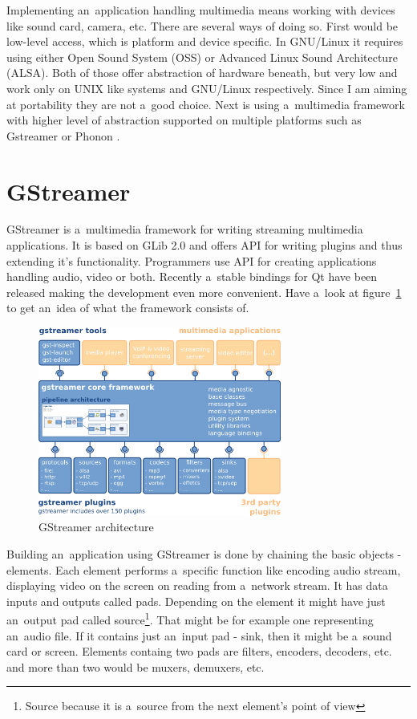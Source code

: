 Implementing an~application handling multimedia means working with devices like sound card, camera, etc. There are several ways of doing so. First would be low-level access, which is platform and device specific. In GNU/Linux it requires using either Open Sound System (OSS) or Advanced Linux Sound Architecture (ALSA). Both of those offer abstraction of hardware beneath, but very low and work only on UNIX like systems and GNU/Linux respectively. Since I am aiming at portability they are not a~good choice. Next is using a~multimedia framework with higher level of abstraction supported on multiple platforms such as Gstreamer \cite{gstreamer} or Phonon \cite{phonon}.  

\section{GStreamer}
GStreamer is a~multimedia framework for writing streaming multimedia applications. It is based on GLib 2.0 and offers API for writing plugins and thus extending it's functionality. Programmers use API for creating applications handling audio, video or both. Recently a~stable bindings for Qt have been released making the development even more convenient. Have a~look at figure~\ref{fig:gstreamerArchitecture} to get an~idea of what the framework consists of.  

\begin{figure}[ht]
	\begin{center}
	\includegraphics[width=8cm]{fig/gstreamer-architecture.png}
	\caption{GStreamer architecture}
	\label{fig:gstreamerArchitecture}
\end{center}
\end{figure}

Building an~application using GStreamer is done by chaining the basic objects - elements. Each element performs a~specific function like encoding audio stream, displaying video on the screen on reading from a~network stream. It has data inputs and outputs called pads. Depending on the element it might have just an~output pad called source\footnote{Source because it is a~source from the next element's point of view}. That might be for example one representing an~audio file. If it contains just an~input pad - sink, then it might be a~sound card or screen. Elements containg two pads are filters, encoders, decoders, etc. and more than two would be muxers, demuxers, etc.

